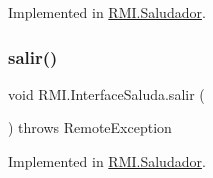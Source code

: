 Implemented in \mbox{\hyperlink{class_r_m_i_1_1_saludador_af163fac056a4927e199c43262d3f3b05}{R\+M\+I.\+Saludador}}.

\mbox{\label{interface_r_m_i_1_1_interface_saluda_a9bfad049387b9c751039d6c796f30db6}} 
\subsubsection{\texorpdfstring{salir()}{salir()}}
{\footnotesize\ttfamily void R\+M\+I.\+Interface\+Saluda.\+salir (\begin{DoxyParamCaption}{ }\end{DoxyParamCaption}) throws Remote\+Exception}



Implemented in \mbox{\hyperlink{class_r_m_i_1_1_saludador_af05a48b9f5aaacd7c3cefcf12e9c1969}{R\+M\+I.\+Saludador}}.

